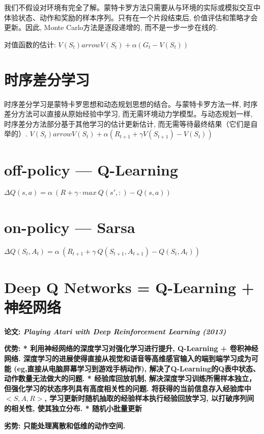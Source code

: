         我们不假设对环境有完全了解。蒙特卡罗方法只需要从与环境的实际或模拟交互中体验状态、动作和奖励的样本序列。只有在一个片段结束后, 价值评估和策略才会更新。因此, Monte Carlo方法是逐段递增的, 而不是一步一步在线的.
        
        对值函数的估计:
            $V (S_t )  arrow V (S_t )+\alpha (G_t-V (S_t ) )$

    \section{时序差分学习}
        时序差分学习是蒙特卡罗思想和动态规划思想的结合。与蒙特卡罗方法一样, 时序差分方法可以直接从原始经验中学习, 而无需环境动力学模型。与动态规划一样, 时序差分方法部分基于其他学习的估计更新估计, 而无需等待最终结果（它们是自举的）.
            $V (S_t )  arrow V (S_t )+\alpha (R_{t+1}+\gamma V (S_{t+1} )-V (S_t ) )$
    
    	\section{off-policy --- Q-Learning}
    	    $\Delta Q(s,a) = \alpha\ ( R + \gamma \cdot max\ Q(s',:) - Q(s,a))$
    	    
    	\section{on-policy --- Sarsa}
    	    $\Delta Q(S_t,A_t) = \alpha\ ( R_{t+1} + \gamma\ Q(S_{t+1}, A_{t+1}) - Q(S_t, A_t))$
    	
    	\section{Deep Q Networks = Q-Learning + 神经网络}
            \bf{论文}: \textit{Playing Atari with Deep Reinforcement Learning (2013)}
        
            \bf{优势}:
            * 利用神经网络的深度学习对强化学习进行提升, Q-Learning + 卷积神经网络. 深度学习的进展使得直接从视觉和语音等高维感官输入的端到端学习成为可能 (eg,直接从电脑屏幕学习到游戏手柄动作), 解决了Q-Learning的Q表中状态、动作数量无法做大的问题.
            * 经验库回放机制, 解决深度学习训练所需样本独立，但强化学习的状态序列具有高度相关性的问题. 将获得的当前信息存入经验库中$<S, A, R>$, 学习更新时随机抽取的经验样本执行经验回放学习, 以打破序列间的相关性, 使其独立分布.
            * 随机小批量更新

            \bf{劣势}: 只能处理离散和低维的动作空间.
        
